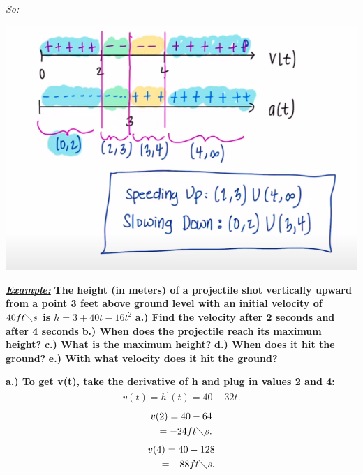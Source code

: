 \documentclass{report}
\begin{document}
   \bigbreak \noindent
   \textit{So:}
   \begin{center}
     \includegraphics[scale=0.8]{3.png}
   \end{center}

   \pagebreak 
   \begin{mdframed}
     \textbf{\textit{\underline{Example:}}} \textbf{The height (in meters) of a projectile shot vertically upward
       from a point 3 feet above ground level with an initial velocity of $40ft\diagdown s$ is $h=3+40t-16t^{2}$
     }
     \bigbreak \noindent 
     \textbf{a.) Find the velocity after 2 seconds and after 4 seconds}
     \smallbreak \noindent
     \textbf{b.) When does the projectile reach its maximum height?}
     \smallbreak \noindent
     \textbf{c.) What is the maximum height?}
     \smallbreak \noindent
     \textbf{d.) When does it hit the ground?}
     \smallbreak \noindent
     \textbf{e.) With what velocity does it hit the ground?}
   \end{mdframed}

   \bigbreak \noindent 
   \textbf{a.) To get v(t), take the derivative of h and plug in values 2 and 4:}
   \begin{align*}
     v(t) = h^{\prime}(t) = 40-32t
   .\end{align*}
   \begin{align*}
     v(2) = 40-64 \\
     = -24 ft\diagdown s
   .\end{align*}
   \begin{align*}
     v(4) = 40 - 128 \\
     = -88 ft\diagdown s
   .\end{align*}
\end{document}

